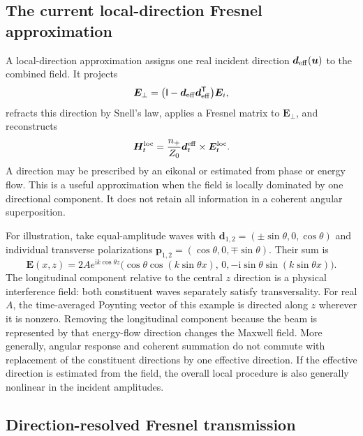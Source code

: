 \documentclass[11pt,a4paper]{article}
\newcommand{\vct}[1]{\bm{#1}}
\newcommand{\ii}{\mathrm i}
\newcommand{\Id}{\mathsf I}
\numberwithin{equation}{section}
\begin{document}
\subsection{The current local-direction Fresnel approximation}
\label{sec:local}

A local-direction approximation assigns one real incident direction
$\vct d_{\rm eff}(\vct u)$ to the combined field. It projects
\begin{equation}
 \vct E_{\perp}=\bigl(\Id-\vct d_{\rm eff}\vct d_{\rm eff}^{\mathsf T}\bigr)
                    \vct E_i,
 \label{eq:localprojection}
\end{equation}
refracts this direction by Snell's law, applies a Fresnel matrix to
$\vct E_\perp$, and reconstructs
\begin{equation}
 \vct H_t^{\rm loc}=\frac{n_+}{Z_0}\vct d_t^{\rm eff}\times\vct E_t^{\rm loc}.
 \label{eq:localH}
\end{equation}
A direction may be prescribed by an eikonal or estimated from phase or energy
flow. This is a useful approximation when the field is locally dominated by
one directional component. It does not retain all information in a coherent
angular superposition.

For illustration, take equal-amplitude waves with
$\vct d_{1,2}=(\pm\sin\theta,0,\cos\theta)$ and individual transverse
polarizations $\vct p_{1,2}=(\cos\theta,0,\mp\sin\theta)$. Their sum is
\begin{equation}
 \vct E(x,z)=2A e^{\ii k\cos\theta z}
 \bigl(\cos\theta\cos(k\sin\theta x),\,0,
       -\ii\sin\theta\sin(k\sin\theta x)\bigr).
 \label{eq:twowaves}
\end{equation}
The longitudinal component relative to the central $z$ direction is a physical
interference field: both constituent waves separately satisfy transversality.
For real $A$, the time-averaged Poynting vector of this example is directed
along $z$ wherever it is nonzero. Removing the longitudinal component because
the beam is represented by that energy-flow direction changes
the Maxwell field. More generally, angular response and coherent summation do
not commute with replacement of the constituent directions by one effective
direction. If the effective direction is estimated from the field, the overall
local procedure is also generally nonlinear in the incident amplitudes.

\subsection{Direction-resolved Fresnel transmission}
\label{sec:spectralT}
\end{document}
